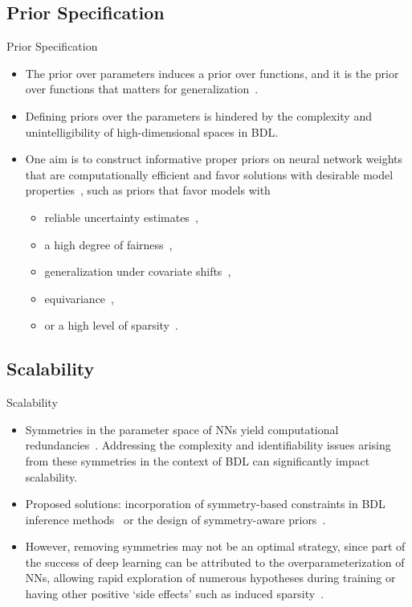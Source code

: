 \documentclass[9pt]{beamer}
\begin{document}
\subsection{Prior Specification}

\begin{frame}{Prior Specification}
\begin{itemize}[<+->]
	\item The prior \alert{over parameters} induces a prior \alert{over functions}, and it is the prior over functions that matters for generalization~\citep{wilson2020bayesian}. 
	\item Defining priors over the parameters is hindered by the complexity and unintelligibility of high-dimensional spaces in BDL. 
	\item One aim is to construct informative proper priors on neural network weights that are \alert{computationally efficient} and \alert{favor solutions with desirable model properties}~\citep{vladimirova2019bayesian,fortuin2022bayesian,rudner2023fseb}, such as priors that favor models with 
	\begin{itemize}
		\item reliable uncertainty estimates~\citep{rudner2023uap}, 
		\item a high degree of fairness~\citep{rudner2024gap}, 
		\item generalization under covariate shifts~\citep{klarner2023qsavi}, 
		\item equivariance~\citep{finzi2021residual}, 
		\item or a high level of sparsity~\citep{ghosh2018structured,polson2018posterior,hubin2019combining}.
	\end{itemize}
\end{itemize}
\end{frame}

\subsection{Scalability}

\begin{frame}{Scalability}
\begin{itemize}[<+->]
	\item \alert{Symmetries} in the parameter space of NNs yield \alert{computational redundancies}~\citep{wiese2023}. Addressing the complexity and identifiability issues arising from these symmetries in the context of BDL can significantly impact \alert{scalability}.
	\item Proposed solutions: incorporation of \alert{symmetry-based constraints} in BDL inference methods~\citep{sen2024} or the design of \alert{symmetry-aware priors}~\citep{atzeni2023infusing}. %
	\item However, removing symmetries may not be an optimal strategy, since part of the success of deep learning can be attributed to the overparameterization of NNs, allowing rapid exploration of numerous hypotheses during training or having other positive `side effects' such as induced sparsity~\citep{kolb2023}. %
\end{itemize}
\end{frame}
\end{document}
